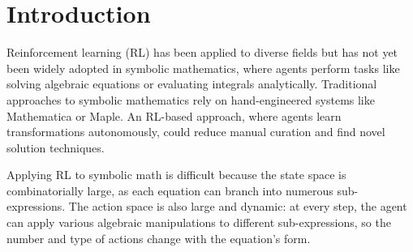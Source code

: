 \documentclass{article}
\theoremstyle{plain}
\theoremstyle{definition}
\theoremstyle{remark}
\begin{document}
\begin{abstract}
We explore whether reinforcement learning (RL) can be useful for symbolic mathematics. Previous work showed contrastive learning can solve linear equations in one variable. We show that model-free PPO~\cite{schulman2017proximal} combined with a graph-based policy (TreeMLP), a dynamic per-state action space, and lightweight inductive biases (curriculum, success replay, constant relabeling) can solve nonlinear equations involving radicals, exponentials, and trigonometric functions---reaching or exceeding state-of-the-art accuracy on the CommonCore benchmark. We then turn to \emph{open} equations, whose solution requires a generative change-of-variables (CoV). We expose the CoV as a macroaction within the same dynamic action space and train a single policy on a mixed dataset of closed and open equations. A combination of training-time and decoding-time interventions -- an action-diversity penalty, a freshness-managed success-replay buffer, a cube-root action, and value-guided beam search with canonical-state deduplication -- raises open-equation test accuracy from $0.27$ (plain baseline) to $0.80$, solving the quadratic, cubic, quartic, and exponential change-of-variables classes at $87$--$100\%$. To our knowledge this is the first RL agent to solve open algebraic equations end-to-end without supervised solution traces.
\end{abstract}

\section{Introduction}
Reinforcement learning (RL) has been applied to diverse fields \citep{ng2006autonomous, degrave2022magnetic, vinyals2019grandmaster} but has not yet been widely adopted in symbolic mathematics, where agents perform tasks like solving algebraic equations or evaluating integrals analytically. Traditional approaches to symbolic mathematics rely on hand-engineered systems like Mathematica or Maple. An RL-based approach, where agents learn transformations autonomously, could reduce manual curation and find novel solution techniques.

Applying RL to symbolic math is difficult because the state space is combinatorially large, as each equation can branch into numerous sub-expressions. The action space is also large and dynamic: at every step, the agent can apply various algebraic manipulations to different sub-expressions, so the number and type of actions change with the equation's form.
\end{document}
